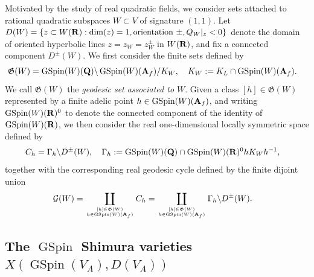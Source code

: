 \documentclass{amsart}
\theoremstyle{definition}
\theoremstyle{definition}
\theoremstyle{definition}
\begin{document}
Motivated by the study of real quadratic fields, 
we consider sets attached to rational quadratic subspaces $W \subset V$ of signature $(1,1)$. 
Let $D(W) = \left\lbrace z \subset W({\bf{R}}): \dim(z) = 1, 
\text{orientation $\pm$}, Q_W \vert_z <0 \right\rbrace $ denote the domain 
of oriented hyperbolic lines $z = z_W = z_W^{\pm}$ in $W({\bf{R}})$, and fix a connected component $D^{\pm}(W)$. 
We first consider the finite sets defined by
\begin{align*}\mathfrak{G}(W) &= \operatorname{GSpin}(W)({\bf{Q}}) \backslash \operatorname{GSpin}(W)({\bf{A}}_f)/K_W, \quad K_W := K_L \cap \operatorname{GSpin}(W)({\bf{A}}_f). \end{align*}
We call $\mathfrak{G}(W)$ the {\it{geodesic set associated to $W$}}. Given a class $[h] \in \mathfrak{G}(W)$
represented by a finite adelic point $h \in \operatorname{GSpin}(W)({\bf{A}}_f)$, and writing
$\operatorname{GSpin}(W)({\bf{R}})^0$ to denote the connected component of the identity of $\operatorname{GSpin}(W)({\bf{R}})$,
we then consider the real one-dimensional locally symmetric space defined by 
\begin{align*} C_h &= \Gamma_h \backslash D^{\pm}(W), \quad \Gamma_h := \operatorname{GSpin}(W)({\bf{Q}}) \cap \operatorname{GSpin}(W)({\bf{R}})^0 h K_W h^{-1},\end{align*}
together with the corresponding real geodesic cycle defined by the finite dijoint union 
\begin{equation}\begin{aligned}\label{geodesic}
\mathcal{G}(W )&= \coprod\limits_{[h] \in \mathfrak{G}(W) \atop h \in \operatorname{GSpin}(W)({\bf{A}}_f)} C_h
=  \coprod\limits_{[h] \in \mathfrak{G}(W) \atop h \in \operatorname{GSpin}(W)({\bf{A}}_f)} \Gamma_h \backslash D^{\pm}(W). \end{aligned} \end{equation}

\subsection{The $\operatorname{GSpin}$ Shimura varieties $X(\operatorname{GSpin}(V_A), D(V_A))$}
\end{document}
